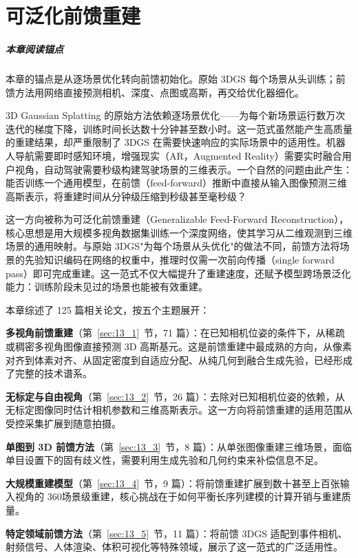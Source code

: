 \chapter{可泛化前馈重建}
\label{ch:13}

\paragraph*{本章阅读锚点}
本章的锚点是从逐场景优化转向前馈初始化。原始 3DGS 每个场景从头训练；前馈方法用网络直接预测相机、深度、点图或高斯，再交给优化器细化。


3D Gaussian Splatting 的原始方法依赖逐场景优化——为每个新场景运行数万次迭代的梯度下降，训练时间长达数十分钟甚至数小时。这一范式虽然能产生高质量的重建结果，却严重限制了 3DGS 在需要快速响应的实际场景中的适用性。机器人导航需要即时感知环境，增强现实（AR，Augmented Reality）需要实时融合用户视角，自动驾驶需要秒级构建驾驶场景的三维表示。一个自然的问题由此产生：能否训练一个通用模型，在前馈（feed-forward）推断中直接从输入图像预测三维高斯表示，将重建时间从分钟级压缩到秒级甚至毫秒级？

这一方向被称为可泛化前馈重建（Generalizable Feed-Forward Reconstruction），核心思想是用大规模多视角数据集训练一个深度网络，使其学习从二维观测到三维场景的通用映射。与原始 3DGS"为每个场景从头优化"的做法不同，前馈方法将场景的先验知识编码在网络的权重中，推理时仅需一次前向传播（single forward pass）即可完成重建。这一范式不仅大幅提升了重建速度，还赋予模型跨场景泛化能力：训练阶段未见过的场景也能被有效重建。

本章综述了 125 篇相关论文，按五个主题展开：

\textbf{多视角前馈重建}（第~\ref{sec:13_1}~节，71 篇）：在已知相机位姿的条件下，从稀疏或稠密多视角图像直接预测 3D 高斯基元。这是前馈重建中最成熟的方向，从像素对齐到体素对齐、从固定密度到自适应分配、从纯几何到融合生成先验，已经形成了完整的技术谱系。

\textbf{无标定与自由视角}（第~\ref{sec:13_2}~节，26 篇）：去除对已知相机位姿的依赖，从无标定图像同时估计相机参数和三维高斯表示。这一方向将前馈重建的适用范围从受控采集扩展到随意拍摄。

\textbf{单图到 3D 前馈方法}（第~\ref{sec:13_3}~节，8 篇）：从单张图像重建三维场景，面临单目设置下的固有歧义性，需要利用生成先验和几何约束来补偿信息不足。

\textbf{大规模重建模型}（第~\ref{sec:13_4}~节，9 篇）：将前馈重建扩展到数十甚至上百张输入视角的 360\textdegree{}场景级重建，核心挑战在于如何平衡长序列建模的计算开销与重建质量。

\textbf{特定领域前馈方法}（第~\ref{sec:13_5}~节，11 篇）：将前馈 3DGS 适配到事件相机、射频信号、人体渲染、体积可视化等特殊领域，展示了这一范式的广泛适用性。

